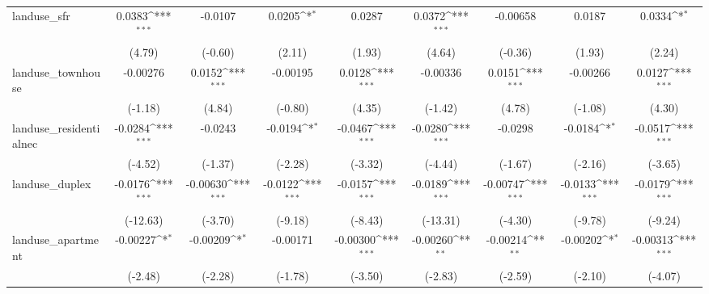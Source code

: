 \begin{table}[htbp]\centering
\def\sym#1{\ifmmode^{#1}\else\(^{#1}\)\fi}
\caption{ \label{tab1}}
\begin{tabular}{l*{8}{c}}
\toprule
\midrule
landuse\_sfr         &      0.0383\sym{***}&     -0.0107         &      0.0205\sym{*}  &      0.0287         &      0.0372\sym{***}&    -0.00658         &      0.0187         &      0.0334\sym{*}  \\
                    &      (4.79)         &     (-0.60)         &      (2.11)         &      (1.93)         &      (4.64)         &     (-0.36)         &      (1.93)         &      (2.24)         \\
\addlinespace
landuse\_townhouse   &    -0.00276         &      0.0152\sym{***}&    -0.00195         &      0.0128\sym{***}&    -0.00336         &      0.0151\sym{***}&    -0.00266         &      0.0127\sym{***}\\
                    &     (-1.18)         &      (4.84)         &     (-0.80)         &      (4.35)         &     (-1.42)         &      (4.78)         &     (-1.08)         &      (4.30)         \\
\addlinespace
landuse\_residentialnec&     -0.0284\sym{***}&     -0.0243         &     -0.0194\sym{*}  &     -0.0467\sym{***}&     -0.0280\sym{***}&     -0.0298         &     -0.0184\sym{*}  &     -0.0517\sym{***}\\
                    &     (-4.52)         &     (-1.37)         &     (-2.28)         &     (-3.32)         &     (-4.44)         &     (-1.67)         &     (-2.16)         &     (-3.65)         \\
\addlinespace
landuse\_duplex      &     -0.0176\sym{***}&    -0.00630\sym{***}&     -0.0122\sym{***}&     -0.0157\sym{***}&     -0.0189\sym{***}&    -0.00747\sym{***}&     -0.0133\sym{***}&     -0.0179\sym{***}\\
                    &    (-12.63)         &     (-3.70)         &     (-9.18)         &     (-8.43)         &    (-13.31)         &     (-4.30)         &     (-9.78)         &     (-9.24)         \\
\addlinespace
landuse\_apartment   &    -0.00227\sym{*}  &    -0.00209\sym{*}  &    -0.00171         &    -0.00300\sym{***}&    -0.00260\sym{**} &    -0.00214\sym{**} &    -0.00202\sym{*}  &    -0.00313\sym{***}\\
                    &     (-2.48)         &     (-2.28)         &     (-1.78)         &     (-3.50)         &     (-2.83)         &     (-2.59)         &     (-2.10)         &     (-4.07)         \\

\end{tabular}
\end{table}
